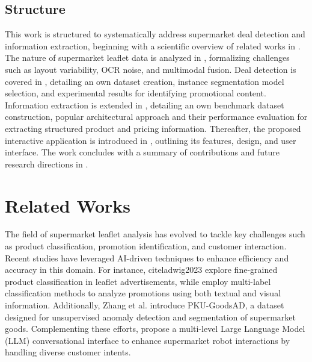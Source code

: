 \documentclass[11pt]{article}
\begin{document}
\subsection{Structure}
This work is structured to systematically address supermarket deal detection and information extraction, beginning with a scientific overview of related works in . The nature of supermarket leaflet data is analyzed in , formalizing challenges such as layout variability, OCR noise, and multimodal fusion. Deal detection is covered in , detailing an own dataset creation, instance segmentation model selection, and experimental results for identifying promotional content. Information extraction is extended in , detailing an own benchmark dataset construction, popular architectural approach and their performance evaluation for extracting structured product and pricing information. Thereafter, the proposed interactive application is introduced in , outlining its features, design, and user interface. The work concludes with a summary of contributions and future research directions in .


\section{Related Works}
\label{sec:related_works}

The field of supermarket leaflet analysis has evolved to tackle key challenges such as product classification, promotion identification, and customer interaction. Recent studies have leveraged AI-driven techniques to enhance efficiency and accuracy in this domain. For instance, cite{ladwig2023} explore fine-grained product classification in leaflet advertisements, while \cite{arroyo2020} employ multi-label classification methods to analyze promotions using both textual and visual information. Additionally, Zhang et al. \cite{zhang2024} introduce PKU-GoodsAD, a dataset designed for unsupervised anomaly detection and segmentation of supermarket goods. Complementing these efforts,\cite{nandkumar2024} propose a multi-level Large Language Model (LLM) conversational interface to enhance supermarket robot interactions by handling diverse customer intents.
\end{document}

